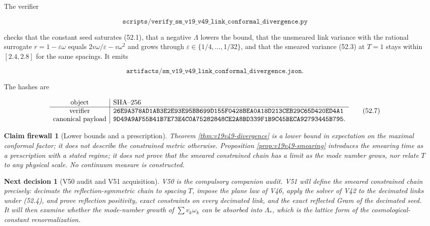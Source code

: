 \documentclass[11pt]{article}
\newtheorem{firewall}[theorem]{Claim firewall}
\newtheorem{decision}[theorem]{Next decision}
\theoremstyle{remark}
\begin{document}
The verifier

\[
 \texttt{scripts/verify\_sm\_v19\_v49\_link\_conformal\_divergence.py}
                                                                    \tag{52.5}
\]

checks that the constant seed saturates (52.1), that a negative
\(\Lambda\) lowers the bound, that the unsmeared link variance with
the rational surrogate \(r=1-\varepsilon\omega\) equals
\(2v\omega/\varepsilon-v\omega^2\) and grows through
\(\varepsilon\in\{1/4,\dots,1/32\}\), and that the smeared variance
(52.3) at \(T=1\) stays within \([2.4,2.8]\) for the same spacings.
It emits

\[
 \texttt{artifacts/sm\_v19\_v49\_link\_conformal\_divergence.json}.  \tag{52.6}
\]

The hashes are

\[
\begin{array}{c|l}
\hbox{object}&\hbox{SHA--256}\\ \hline
\hbox{verifier}&
\texttt{26E9A378AD1AB3E2E93E95BB699D155F0428BEA0A18D213CEB29C65D420ED4A1}\\
\hbox{canonical payload}&
\texttt{9D49A9AF55B41B7E73E4C0A75282848CE2A8BD339F1B9C45BECA92793445B795}.
\end{array}                                                     \tag{52.7}
\]

\begin{firewall}[Lower bounds and a prescription]
\label{fire:v19v49}
Theorem \ref{thm:v19v49-divergence} is a lower bound in expectation on
the maximal conformal factor; it does not describe the constrained
metric otherwise.  Proposition \ref{prop:v19v49-smearing} introduces
the smearing time as a prescription with a stated regime; it does not
prove that the smeared constrained chain has a limit as the mode number
grows, nor relate \(T\) to any physical scale.  No continuum measure is
constructed.
\end{firewall}

\begin{decision}[V50 audit and V51 acquisition]
\label{dec:v19v49-next}
V50 is the compulsory companion audit.  V51 will define the smeared
constrained chain precisely: decimate the reflection-symmetric chain to
spacing \(T\), impose the plane law of V46, apply the solver of V42 to
the decimated links under (52.4), and prove reflection positivity,
exact constraints on every decimated link, and the exact reflected
Gram of the decimated seed.  It will then examine whether the mode-number
growth of \(\sum v_k\omega_k\) can be absorbed into \(\Lambda_*\), which
is the lattice form of the cosmological-constant renormalization.
\end{decision}
\end{document}
